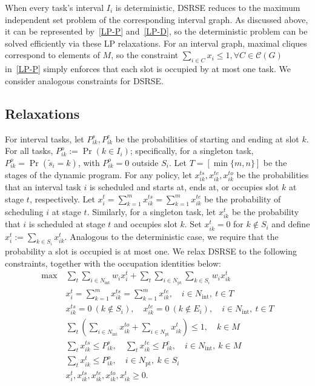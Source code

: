 \documentclass{article}
\begin{document}
When {every task's interval $I_i$ is deterministic}, DSRSE reduces to the maximum independent set problem of the corresponding interval graph.
As discussed above, it can be represented by~\eqref{LP-P} and~\eqref{LP-D}, so the deterministic problem can be solved efficiently via these LP relaxations.
For an interval graph, maximal cliques {correspond to} elements of $M$, so the constraint $\sum_{i\in C}x_i\leq 1,\forall C\in\mathcal{C}(G)$ in~\eqref{LP-P} simply enforces that each slot is occupied by at most one task.
We consider analogous constraints for DSRSE.

\subsection{Relaxations}

{For interval tasks, let $P_{ik}^s,P_{ik}^e$ be the probabilities of starting and ending at slot $k$. For all tasks, $P_{ik}^o:=\Pr(k\in I_i)$; specifically, for a singleton task, $P_{ik}^o=\Pr(\widetilde s_i=k)$, with $P_{ik}^o=0$ outside $S_i$.}
Let $T=[\min\{m,n\}]$ be the stages of the dynamic program.
For any policy, let $x_{ik}^{ts},x_{ik}^{te},x_{ik}^{to}$ be the probabilities that {an interval task }$i$ is scheduled and starts at, ends at, or occupies slot $k$ at stage $t$, respectively.
Let $x_i^t = \sum_{k=1}^m x_{ik}^{ts}=\sum_{k=1}^{m} x_{ik}^{te}$ be the probability of scheduling $i$ at stage $t$.
{Similarly, for a singleton task, let $x_{ik}^t$ be the probability that $i$ is scheduled at stage $t$ and occupies slot $k$. Set $x_{ik}^t=0$ for $k\notin S_i$ and define $x_i^t:=\sum_{k\in S_i}x_{ik}^t$.}
Analogous to the deterministic case, we require that the probability a slot is occupied is at most one.
We relax DSRSE to the following constraints, together with the occupation identities below:
\begin{align*}
    \max~&\sum_t\sum_{i\in N_{\mathrm{int}}}w_i x_i^t
             +\sum_t\sum_{i\in N_{\mathrm{pt}}}\sum_{k\in S_i}w_i x_{ik}^t\\
    &x_i^t=\sum_{k=1}^m x_{ik}^{ts}=\sum_{k=1}^m x_{ik}^{te},\quad i\in N_{\mathrm{int}},\ t\in T\\
    &x_{ik}^{ts}=0\ (k\notin S_i),\quad x_{ik}^{te}=0\ (k\notin E_i),\quad i\in N_{\mathrm{int}},\ t\in T\\
    &\sum_t\left(\sum_{i\in N_{\mathrm{int}}}x_{ik}^{to}+\sum_{i\in N_{\mathrm{pt}}}x_{ik}^t\right)\leq1,\quad k\in M\\
    &\sum_t x_{ik}^{ts}\leq P_{ik}^s,\quad\sum_t x_{ik}^{te}\leq P_{ik}^e,\quad i\in N_{\mathrm{int}},\ k\in M\\
    &\sum_t x_{ik}^t\leq P^o_{ik},\quad i\in N_{\mathrm{pt}},\ k\in S_i\\
    &x_i^t,x_{ik}^{ts},x_{ik}^{te},x_{ik}^{to},x_{ik}^t\geq0.
\end{align*}
\end{document}
